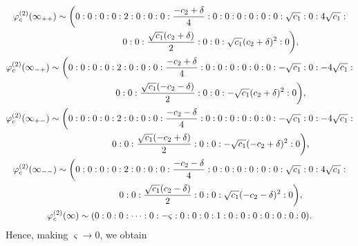 \documentclass[10pt,a4paper]{amsart}
\numberwithin{equation}{section}
\begin{document}
\begin{gather*}
 \varphi_c^{(2)}(\infty_{++}) \sim
 \biggl(0:0:0:0:2:0:0:0:\frac{-c_2+\delta}{4}:0:0:0:0:0:0: \sqrt{c_1}:0:4\sqrt{c_1}:\\ \hphantom{\varphi_c^{(2)}(\infty_{++}) \sim\biggl(}{}
 0:0:\frac{\sqrt{c_1}(c_2+\delta)}{2}:0:0:\sqrt{c_1}(c_2+\delta)^2:0\biggr),\\
 \varphi_c^{(2)}(\infty_{-+})\sim
 \biggl(0:0:0:0:2:0:0:0:\frac{-c_2+\delta}{4}:0:0:0:0:0:0: -\sqrt{c_1}:0:-4\sqrt{c_1}:\\ \hphantom{\varphi_c^{(2)}(\infty_{-+})\sim\biggl(}{}
 0:0:\frac{\sqrt{c_1}(-c_2-\delta)}{2}:0:0:-\sqrt{c_1}(c_2+\delta)^2:0\biggr),\\
 \varphi_c^{(2)}(\infty_{+-})\sim
 \biggl(0:0:0:0:2:0:0:0:\frac{-c_2-\delta}{4}:0:0:0:0:0:0: -\sqrt{c_1}:0:-4\sqrt{c_1}:\\ \hphantom{\varphi_c^{(2)}(\infty_{+-})\sim\biggl(}{}
 0:0:\frac{\sqrt{c_1}(-c_2+\delta)}{2}:0:0:-\sqrt{c_1}(-c_2+\delta)^2:0\biggr),\\
 \varphi_c^{(2)}(\infty_{--})\sim
 \biggl(0:0:0:0:2:0:0:0:\frac{-c_2-\delta}{4}:0:0:0:0:0:0: \sqrt{c_1}:0:4\sqrt{c_1}:\\ \hphantom{\varphi_c^{(2)}(\infty_{--})\sim\biggl(}{}
 0:0:\frac{\sqrt{c_1}(c_2-\delta)}{2}:0:0:\sqrt{c_1}(-c_2-\delta)^2:0\biggr),\\
 \varphi_c^{(2)}(\infty) \sim (0:0:0:\dots:0:-\varsigma:0:0:0:1:0:0:0:0:0:0:0).
\end{gather*}
Hence, making $\varsigma \rightarrow 0$, we obtain
\end{document}

